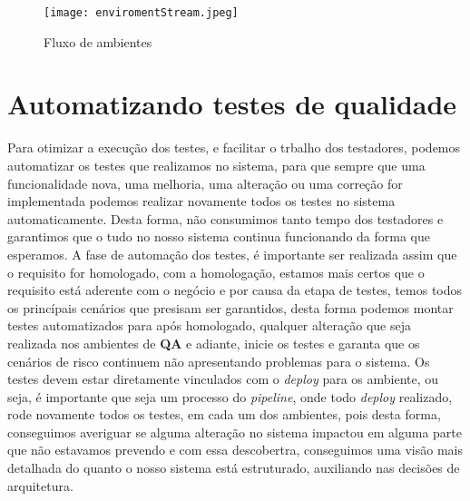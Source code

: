       \begin{figure}[!h]
        \centering
        \texttt{[image: enviromentStream.jpeg]}
        \caption{Fluxo de ambientes}
        \label{Imagem:2}
      \end{figure}

    \section{Automatizando testes de qualidade}
      Para otimizar a execução dos testes, e facilitar o trbalho dos testadores,
      podemos automatizar os testes que realizamos no sistema, para que sempre que
      uma funcionalidade nova, uma melhoria, uma alteração ou uma correção for
      implementada podemos realizar novamente todos os testes no sistema
      automaticamente. Desta forma, não consumimos tanto tempo dos testadores e
      garantimos que o tudo no nosso sistema continua funcionando da forma que
      esperamos. A fase de automação dos testes, é importante ser realizada assim
      que o requisito for homologado, com a homologação, estamos mais certos que o
      requisito está aderente com o negócio e por causa da etapa de testes, temos
      todos os princípais cenários que presisam ser garantidos, desta forma podemos
      montar testes automatizados para após homologado, qualquer alteração que seja
      realizada nos ambientes de \textbf{QA} e adiante, inicie os testes e garanta
      que os cenários de risco continuem não apresentando problemas para o sistema. \newline
      Os testes devem estar diretamente vinculados com o \textit{deploy} para os
      ambiente, ou seja, é importante que seja um processo do \textit{pipeline},
      onde todo \textit{deploy} realizado, rode novamente todos os testes, em cada
      um dos ambientes, pois desta forma, conseguimos averiguar se alguma alteração
      no sistema impactou em alguma parte que não estavamos prevendo e com essa
      descobertra, conseguimos uma visão mais detalhada do quanto o nosso sistema
      está estruturado, auxiliando nas decisões de arquitetura.

